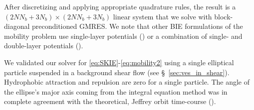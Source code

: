 \documentclass[lineno]{jfm}
\newcommand{\xx}{\mathbf{x}}
\newcommand{\uu}{\mathbf{u}}
\begin{document}
After discretizing and applying appropriate quadrature rules, the result
is a $(2NN_b + 3N_b) \times (2NN_b + 3N_b)$ linear system that we solve
with block-diagonal preconditioned GMRES. We note that other BIE
formulations of the mobility problem use single-layer potentials
(\cite{cor-gre-rac-vee2017, rac-gre2016}) or a combination of single-
and double-layer potentials (\cite{cor-vee2018}).

We validated our solver for \eqref{eq:SKIE}-\eqref{eq:mobility2} using a
single elliptical particle suspended in a background shear flow (see
\S~\ref{sec:ves_in_shear}). Hydrophobic attraction and repulsion are
zero for a single particle. The angle of the ellipse's major axis coming
from the integral equation method was in complete agreement with the
theoretical, Jeffrey orbit time-course (\cite{jef1922}). 
  
% 


\end{document}
